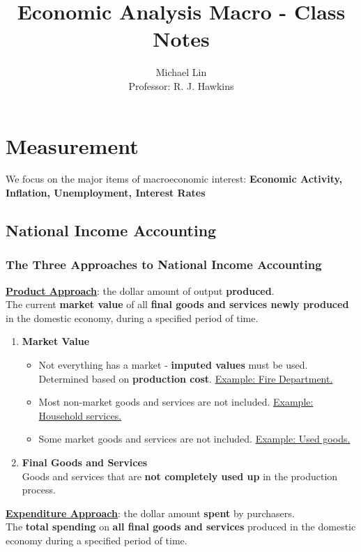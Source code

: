 \documentclass[a4paper]{article}
\title{Economic Analysis Macro - Class Notes}
\author{Michael Lin \\ Professor: R. J. Hawkins}
\begin{document}
\maketitle

\section{Measurement}

We focus on the major items of macroeconomic interest: \textbf{Economic Activity, Inflation, Unemployment, Interest Rates}

\subsection{National Income Accounting}
\subsubsection*{The Three Approaches to National Income Accounting}
\underline{\textbf{Product Approach}}: the dollar amount of output \textbf{produced}. \smallskip \\
The current \textbf{market value} of all \textbf{final goods and services newly produced} in the domestic economy, 
during a specified period of time.
\begin{enumerate}
    \item \textbf{Market Value} \begin{itemize}
        \item Not everything has a market - \textbf{imputed values} must be used. Determined based on \textbf{production cost}. 
        \underline{Example: Fire Department.}
        \item Most non-market goods and services are not included. \underline{Example: Household services.}
        \item Some market goods and services are not included. \underline{Example: Used goods.}
    \end{itemize}
    \item \textbf{Final Goods and Services} \smallskip \\
    Goods and services that are \textbf{not completely used up} in the production process.
\end{enumerate}
\underline{\textbf{Expenditure Approach}}: the dollar amount \textbf{spent} by purchasers. \smallskip \\
The \textbf{total spending} on \textbf{all final goods and services} produced in the domestic economy during a specified period of time.
\end{document}
